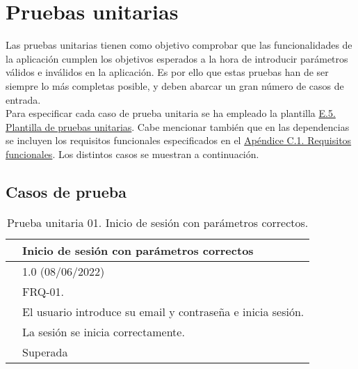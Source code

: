 \section{Pruebas unitarias}

Las pruebas unitarias \cite{pruebaunitaria} tienen como objetivo comprobar que las funcionalidades de la aplicación cumplen los objetivos esperados a la hora de introducir parámetros válidos e inválidos en la aplicación. Es por ello que estas pruebas han de ser siempre lo más completas posible, y deben abarcar un gran número de casos de entrada.
\\

Para especificar cada caso de prueba unitaria se ha empleado la plantilla \hyperref[enlacePUX]{E.5. Plantilla de pruebas unitarias}. Cabe mencionar también que en las dependencias se incluyen los requisitos funcionales especificados en el \hyperref[APRequisitosFuncionales]{Apéndice C.1. Requisitos funcionales}. Los distintos casos se muestran a continuación.

\subsection{Casos de prueba}

\begin{table}[H]
\begin{center}
\begin{tabular}{|p{3cm}|p{10cm}|} \hline
\centering {\bf PU-01} & Inicio de sesión con parámetros correctos  \\ \hline\hline
\centering {\bf Versión} & 1.0 (08/06/2022) \\ \hline
\centering {\bf Dependencias} &  FRQ-01. \\ \hline
\centering {\bf Descripción} &  El usuario introduce su email y contraseña e inicia sesión. \\ \hline
\centering {\bf Criterio de aceptación} & La sesión se inicia correctamente. \\ \hline
\centering {\bf Estado} & Superada \\ \hline
\end{tabular}
\caption{Prueba unitaria 01. Inicio de sesión con parámetros correctos.}
\label{enlacePU1}
\end{center}
\end{table}

